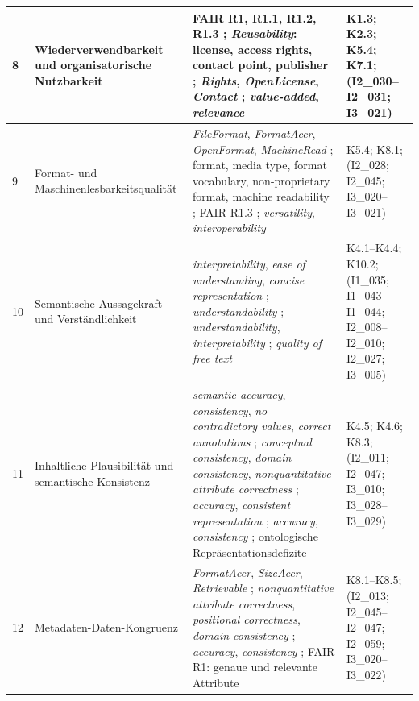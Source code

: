\begin{center}
\begin{longtable}{p{} p{} p{} p{}}
8 &
Wiederverwendbarkeit und organisatorische Nutzbarkeit &
FAIR R1, R1.1, R1.2, R1.3 \cite{wilkinson2016fair}; \textit{Reusability}: license, access rights, contact point, publisher \cite{wentzel2023extensive,data_europa}; \textit{Rights}, \textit{OpenLicense}, \textit{Contact} \cite{Neumaier2016MetadataQuality}; \textit{value-added}, \textit{relevance} \cite{wang1996beyond} &
K1.3; K2.3; K5.4; K7.1; (I2\_030--I2\_031; I3\_021) \\ \hline

9 &
Format- und Maschinenlesbarkeitsqualität &
\textit{FileFormat}, \textit{FormatAccr}, \textit{OpenFormat}, \textit{MachineRead} \cite{Neumaier2016MetadataQuality}; format, media type, format vocabulary, non-proprietary format, machine readability \cite{wentzel2023extensive,data_europa}; FAIR R1.3 \cite{wilkinson2016fair}; \textit{versatility}, \textit{interoperability} \cite{Zaveri2016LinkedDataQuality} &
K5.4; K8.1; (I2\_028; I2\_045; I3\_020--I3\_021) \\ \hline

10 &
Semantische Aussagekraft und Verständlichkeit &
\textit{interpretability}, \textit{ease of understanding}, \textit{concise representation} \cite{wang1996beyond}; \textit{understandability} \cite{iso25012}; \textit{understandability}, \textit{interpretability} \cite{Zaveri2016LinkedDataQuality}; \textit{quality of free text} \cite{noguerasiso_quality_metadata} &
K4.1--K4.4; K10.2; (I1\_035; I1\_043--I1\_044; I2\_008--I2\_010; I2\_027; I3\_005) \\ \hline

11 &
Inhaltliche Plausibilität und semantische Konsistenz &
\textit{semantic accuracy}, \textit{consistency}, \textit{no contradictory values}, \textit{correct annotations} \cite{Zaveri2016LinkedDataQuality}; \textit{conceptual consistency}, \textit{domain consistency}, \textit{nonquantitative attribute correctness} \cite{noguerasiso_quality_metadata}; \textit{accuracy}, \textit{consistent representation} \cite{wang1996beyond}; \textit{accuracy}, \textit{consistency} \cite{iso25012}; ontologische Repräsentationsdefizite \cite{wand1996anchoring} &
K4.5; K4.6; K8.3; (I2\_011; I2\_047; I3\_010; I3\_028--I3\_029) \\ \hline

12 &
Metadaten-Daten-Kongruenz &
\textit{FormatAccr}, \textit{SizeAccr}, \textit{Retrievable} \cite{Neumaier2016MetadataQuality}; \textit{nonquantitative attribute correctness}, \textit{positional correctness}, \textit{domain consistency} \cite{noguerasiso_quality_metadata}; \textit{accuracy}, \textit{consistency} \cite{Zaveri2016LinkedDataQuality}; FAIR R1: genaue und relevante Attribute \cite{wilkinson2016fair} &
K8.1--K8.5; (I2\_013; I2\_045--I2\_047; I2\_059; I3\_020--I3\_022) \\ \hline


\end{longtable}
\end{center}
